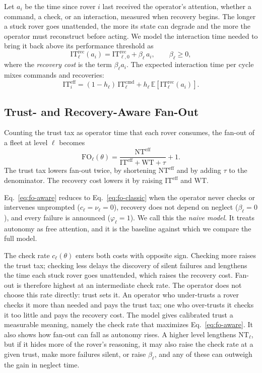 \documentclass[conference]{IEEEtran}
\begin{document}
Let $a_i$ be the time since rover $i$ last received the operator's
attention, whether a command, a check, or an interaction, measured
when recovery begins. The longer a stuck rover goes unattended, the
more its state can degrade and the more the operator must reconstruct
before acting. We model the interaction time needed to bring it back
above its performance threshold as
\begin{equation}
  \mathrm{IT}^{\mathrm{rec}}_\ell(a_i) = \mathrm{IT}^{\mathrm{rec}}_{\ell,0} + \beta_\ell\, a_i,
  \qquad \beta_\ell \ge 0 ,
  \label{eq:it-rec}
\end{equation}
where the \emph{recovery cost} is the term $\beta_\ell a_i$. The
expected interaction time per cycle mixes commands and recoveries:
\begin{equation}
  \mathrm{IT}^{\mathrm{eff}}_i = (1-h_\ell)\,\mathrm{IT}^{\mathrm{cmd}}_\ell
  + h_\ell\,\mathbb{E}\!\left[\mathrm{IT}^{\mathrm{rec}}_\ell(a_i)\right].
  \label{eq:it-eff}
\end{equation}

\subsection{Trust- and Recovery-Aware Fan-Out}
\label{sec:fo-aware}
Counting the trust tax as operator time that each rover consumes, the
fan-out of a fleet at level $\ell$ becomes
\begin{equation}
  \mathrm{FO}_\ell(\theta) =
  \frac{\mathrm{NT}^{\mathrm{eff}}}{\mathrm{IT}^{\mathrm{eff}} + \mathrm{WT} + \tau} + 1 .
  \label{eq:fo-aware}
\end{equation}
The trust tax lowers fan-out twice, by shortening
$\mathrm{NT}^{\mathrm{eff}}$ and by adding $\tau$ to the denominator.
The recovery cost lowers it by raising $\mathrm{IT}^{\mathrm{eff}}$ and
$\mathrm{WT}$.

Eq.~\eqref{eq:fo-aware} reduces to Eq.~\eqref{eq:fo-classic} when the
operator never checks or intervenes unprompted ($c_\ell = \nu_\ell =
0$), recovery does not depend on neglect ($\beta_\ell = 0$), and every
failure is announced ($\varphi_\ell = 1$). We call this the
\emph{naive model}. It treats autonomy as free attention, and it is
the baseline against which we compare the full model.

The check rate $c_\ell(\theta)$ enters both costs with opposite sign.
Checking more raises the trust tax; checking less delays the discovery
of silent failures and lengthens the time each stuck rover goes
unattended, which raises the recovery cost. Fan-out is therefore
highest at an intermediate check rate. The operator does not choose
this rate directly: trust sets it. An operator who under-trusts a
rover checks it more than needed and pays the trust tax; one who
over-trusts it checks it too little and pays the recovery cost. The
model gives calibrated trust a measurable meaning, namely the check
rate that maximizes Eq.~\eqref{eq:fo-aware}. It also shows how fan-out
can fall as autonomy rises. A higher level lengthens
$\mathrm{NT}_\ell$, but if it hides more of the rover's reasoning, it
may also raise the check rate at a given trust, make more failures
silent, or raise $\beta_\ell$, and any of these can outweigh the gain
in neglect time.
\end{document}
